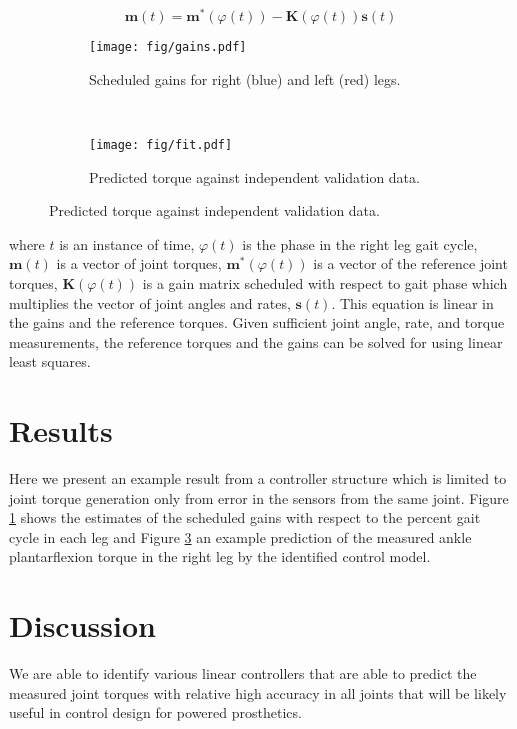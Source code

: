 \documentclass[10pt,letterpaper,notitlepage]{article}
\begin{document}
\begin{equation}
  \mathbf{m}(t) = \mathbf{m}^*(\varphi(t)) -
  \mathbf{K}(\varphi(t))\mathbf{s}(t)
\end{equation}
%
\begin{figure}[b]
  \centering
  \begin{subfigure}[b]{0.5\textwidth}
    \texttt{[image: fig/gains.pdf]}
    \caption{Scheduled gains for right (blue) and left (red) legs.}
    \label{fig:gull}
  \end{subfigure}%
  ~ %
  \begin{subfigure}[b]{0.5\textwidth}
    \texttt{[image: fig/fit.pdf]}
    \caption{Predicted torque against independent validation data.}
    \label{fig:tiger}
  \end{subfigure}
\end{figure}
%
where $t$ is an instance of time, $\varphi(t)$ is the phase in the right leg
gait cycle, $\mathbf{m}(t)$ is a vector of joint torques,
$\mathbf{m}^*(\varphi(t))$ is a vector of the reference joint torques,
$\mathbf{K}(\varphi(t))$ is a gain matrix scheduled with respect to gait phase
which multiplies the vector of joint angles and rates, $\mathbf{s}(t)$. This
equation is linear in the gains and the reference torques. Given sufficient
joint angle, rate, and torque measurements, the reference torques and the gains
can be solved for using linear least squares.
%
\section*{Results}
%
Here we present an example result from a controller structure which is limited
to joint torque generation only from error in the sensors from the same joint.
Figure \ref{fig:gull} shows the estimates of the scheduled gains with respect
to the percent gait cycle in each leg and Figure \ref{fig:tiger} an example
prediction of the measured ankle plantarflexion torque in the right leg by the
identified control model.
%
\section*{Discussion}
%
We are able to identify various linear controllers that are able to predict the
measured joint torques with relative high accuracy in all joints that will be
likely useful in control design for powered prosthetics.
\end{document}
